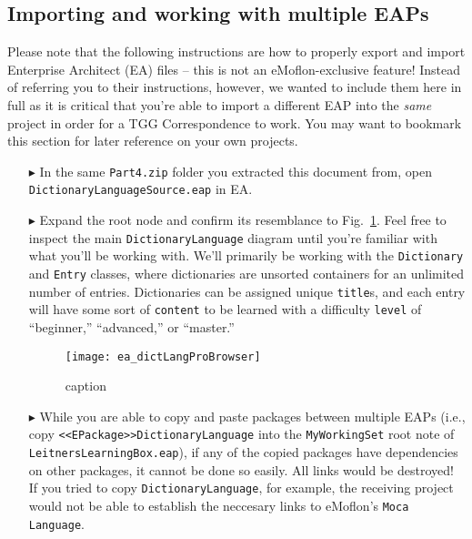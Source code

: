 \newpage
\subsection{Importing and working with multiple EAPs}
\visHeader
\label{sec:multiEAP}

Please note that the following instructions are how to properly export and import Enterprise Architect (EA) files -- this is not an
eMoflon-exclusive feature! Instead of referring you to their instructions, however, we wanted to include them here in full as it is critical that you're able to
import a different EAP into the \emph{same} project in order for a TGG Correspondence to work. You may want to bookmark this section for later reference on your
own projects.

\begin{itemize}

\item[$\blacktriangleright$] In the same \texttt{Part4.zip} folder you extracted this document from, open \texttt{DictionaryLanguageSource.eap} in EA.

\item[$\blacktriangleright$] Expand the root node and confirm its resemblance to Fig.~\ref{fig:dictionaryLangStart}. Feel free to inspect the main
\texttt{DictionaryLanguage} diagram until you're familiar with what you'll be working with. We'll primarily be working with the \texttt{Dictionary} and
\texttt{Entry} classes, where dictionaries are unsorted containers for an unlimited number of entries. Dictionaries can be assigned unique \texttt{title}s,
and each entry will have some sort of \texttt{content} to be learned with a difficulty \texttt{level} of ``beginner,'' ``advanced,'' or ``master.''

\vspace{0.5cm}

\begin{figure}[htbp]
\begin{center}
  \texttt{[image: ea\_dictLangProBrowser]}
  \caption{caption}
  \label{fig:dictionaryLangStart}
\end{center}
\end{figure}

\item[$\blacktriangleright$] While you are able to copy and paste packages between multiple EAPs (i.e., copy \texttt{<<EPack\-age>>DictionaryLanguage} into the
\texttt{MyWorkingSet} root note of \texttt{Leit\-nersLearningBox.eap}), if any of the copied packages have dependencies on other packages, it cannot be done so
easily. All links would be destroyed! If you tried to copy \texttt{DictionaryLanguage}, for example, the receiving project would not be able to establish the
neccesary links to eMoflon's \texttt{Moca Language}.


\end{itemize}
